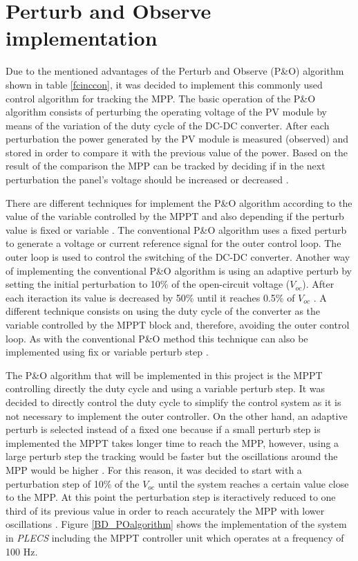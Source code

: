 \section{Perturb and Observe implementation}\label{MPPTImplementation}

Due to the mentioned advantages of the Perturb and Observe (P\&O) algorithm shown in table \ref{fcinccon}, it was decided to implement this commonly used control algorithm for tracking the MPP. The basic operation of the P\&O algorithm consists of perturbing the operating voltage of the PV module by means of the variation of the duty cycle of the DC-DC converter. After each perturbation the power generated by the PV module is measured (observed) and stored in order to compare it with the previous value of the power. Based on the result of the comparison the MPP can be tracked by deciding if in the next perturbation the panel's voltage should be increased or decreased .

There are different techniques for implement the P\&O algorithm according to the value of the variable controlled by the MPPT and also depending if the perturb value is fixed or variable \cite{implementationPandO}. The conventional P\&O algorithm uses a fixed perturb to generate a voltage or current reference signal for the outer control loop. The outer loop is used to control the switching of the DC-DC converter. Another way of implementing the conventional P\&O algorithm is using an adaptive perturb by setting the initial perturbation to 10\% of the open-circuit voltage ($V_{oc}$). After each iteraction its value is decreased by 50\% until it reaches 0.5\%
of $V_{oc}$ \cite{implementationPandO}. A different technique consists on using the duty cycle of the converter as the variable controlled by the MPPT block and, therefore, avoiding the outer control loop. As with the conventional P\&O method this technique can also be implemented using fix or variable perturb step \cite{implementationPandO}. 

The P\&O algorithm that will be implemented in this project is the MPPT controlling directly the duty cycle and using a variable perturb step. It was decided to directly control the duty cycle to simplify the control system as it is not necessary to implement the outer controller. On the other hand, an adaptive perturb is selected instead of a fixed one because if a small perturb step is implemented the MPPT takes longer time to reach the MPP, however, using a large perturb step the tracking would be faster but the oscillations around the MPP would be higher \cite{implementationPandO}. For this reason, it was decided to start with a perturbation step of 10\% of the $V_{oc}$ until the system reaches a certain value close to the MPP. At this point the perturbation step is iteractively reduced to one third of its previous value in order to reach accurately the MPP with lower oscillations . Figure \ref{BD_POalgorithm} shows the implementation of the system in \textit{PLECS} including the MPPT controller unit which operates at a frequency of 100 Hz. 

